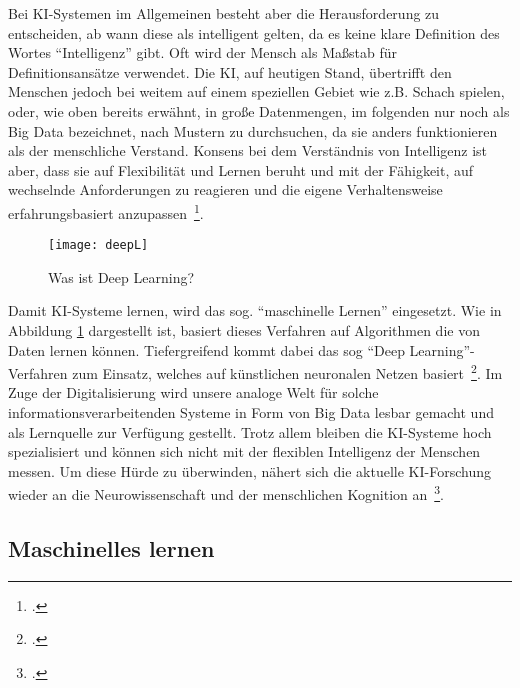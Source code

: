 Bei \ac{KI}-Systemen im Allgemeinen besteht aber die Herausforderung zu entscheiden, ab wann diese als intelligent gelten, da es keine klare Definition des Wortes \enquote{Intelligenz} gibt.
Oft wird der Mensch als Maßstab für Definitionsansätze verwendet. Die \ac{KI}, auf heutigen Stand, übertrifft den Menschen jedoch bei weitem auf einem speziellen Gebiet wie z.B. Schach spielen,
oder, wie oben bereits erwähnt, in große Datenmengen, im folgenden nur noch als Big Data bezeichnet, nach Mustern zu durchsuchen, da sie anders funktionieren als der menschliche Verstand.
Konsens bei dem Verständnis von Intelligenz ist aber, dass sie auf Flexibilität und Lernen beruht und mit der Fähigkeit, auf wechselnde Anforderungen zu reagieren und die eigene 
Verhaltensweise erfahrungsbasiert anzupassen~\footcite[\vglf][]{Lenzen.2020}. 

\begin{figure}[H]
    \caption{Was ist Deep Learning?}
    \texttt{[image: deepL]}
    \label{fig:deepL}
    \\
    \cite[Quelle: Vgl.][]{DeepLearning}
\end{figure}

Damit \ac{KI}-Systeme lernen, wird das sog. \enquote{maschinelle Lernen} eingesetzt. Wie in Abbildung \ref{fig:deepL} dargestellt ist, basiert dieses Verfahren auf Algorithmen die von Daten lernen können. Tiefergreifend kommt dabei das 
sog \enquote{Deep Learning}-Verfahren zum Einsatz, welches auf künstlichen neuronalen Netzen basiert~\footcite[\vglf][]{Lenzen.2020}.
Im Zuge der Digitalisierung wird unsere analoge Welt für solche informationsverarbeitenden Systeme in Form von Big Data lesbar gemacht und als Lernquelle zur Verfügung gestellt.
Trotz allem bleiben die \ac{KI}-Systeme hoch spezialisiert und können sich nicht mit der flexiblen Intelligenz der Menschen messen. Um diese Hürde zu überwinden, nähert sich die 
aktuelle \ac{KI}-Forschung wieder an die Neurowissenschaft und der menschlichen Kognition an~\footcite[\vglf][]{Lenzen.2020}.

\subsection{Maschinelles lernen}


